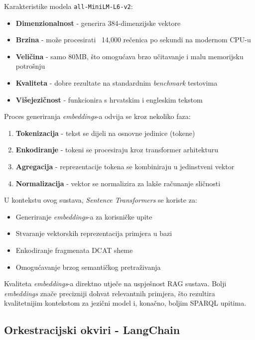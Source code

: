 Karakteristike modela \texttt{all-MiniLM-L6-v2}:

\begin{itemize}
    \item \textbf{Dimenzionalnost} - generira 384-dimenzijske vektore
    \item \textbf{Brzina} - može procesirati ~14,000 rečenica po sekundi na modernom CPU-u
    \item \textbf{Veličina} - samo 80MB, što omogućava brzo učitavanje i malu memorijsku potrošnju
    \item \textbf{Kvaliteta} - dobre rezultate na standardnim \textit{benchmark} testovima
    \item \textbf{Višejezičnost} - funkcionira s hrvatskim i engleskim tekstom
\end{itemize}

Proces generiranja \textit{embeddings}-a odvija se kroz nekoliko faza:

\begin{enumerate}
    \item \textbf{Tokenizacija} - tekst se dijeli na osnovne jedinice (tokene)
    \item \textbf{Enkodiranje} - tokeni se procesiraju kroz transformer arhitekturu
    \item \textbf{Agregacija} - reprezentacije tokena se kombiniraju u jedinstveni vektor
    \item \textbf{Normalizacija} - vektor se normalizira za lakše računanje sličnosti
\end{enumerate}

U kontekstu ovog sustava, \textit{Sentence Transformers} se koriste za:

\begin{itemize}
    \item Generiranje \textit{embeddings}-a za korisničke upite
    \item Stvaranje vektorskih reprezentacija primjera u bazi
    \item Enkodiranje fragmenata DCAT sheme
    \item Omogućavanje brzog semantičkog pretraživanja
\end{itemize}

Kvaliteta \textit{embeddings}-a direktno utječe na uspješnost RAG sustava. Bolji \textit{embeddings} znače precizniji dohvat relevantnih primjera, što rezultira kvalitetnijim kontekstom za jezični model i, konačno, boljim SPARQL upitima.

\subsection{Orkestracijski okviri - LangChain}

